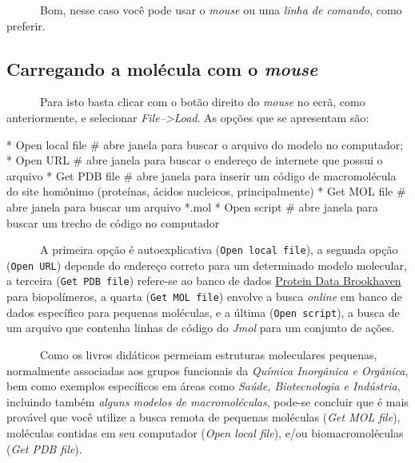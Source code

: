 \documentclass[
  letterpaper,
  DIV=11,
  numbers=noendperiod]{scrreprt}
\newenvironment{Shaded}{\begin{snugshade}}{\end{snugshade}}
\newcommand{\CommentTok}[1]{\textcolor[rgb]{0.37,0.37,0.37}{#1}}
\newcommand{\NormalTok}[1]{\textcolor[rgb]{0.00,0.23,0.31}{#1}}
\newcommand{\SpecialCharTok}[1]{\textcolor[rgb]{0.37,0.37,0.37}{#1}}
\begin{document}
~~~~~~Bom, nesse caso você pode usar o \emph{mouse} ou uma \emph{linha
de comando}, como preferir.

\subsection{\texorpdfstring{Carregando a molécula com o
\emph{mouse}}{Carregando a molécula com o mouse}}\label{carregando-a-moluxe9cula-com-o-mouse}

~~~~~~Para isto basta clicar com o botão direito do \emph{mouse} no
ecrã, como anteriormente, e selecionar \emph{File--\textgreater Load}.
As opções que se apresentam são:

\begin{Shaded}
\begin{Highlighting}[]
\SpecialCharTok{*}\NormalTok{ Open local file }\CommentTok{\# abre janela para buscar o arquivo do modelo no computador;}
\SpecialCharTok{*}\NormalTok{ Open URL }\CommentTok{\# abre janela para buscar o endereço de internete que possui o arquivo}
\SpecialCharTok{*}\NormalTok{ Get PDB file }\CommentTok{\# abre janela para inserir um código de macromolécula do site homônimo (proteínas, ácidos nucleicos, principalmente)}
\SpecialCharTok{*}\NormalTok{ Get MOL file }\CommentTok{\# abre janela para buscar um arquivo *.mol}
\SpecialCharTok{*}\NormalTok{ Open script }\CommentTok{\# abre janela para buscar um trecho de código no computador}
\end{Highlighting}
\end{Shaded}

~~~~~~A primeira opção é autoexplicativa (\texttt{Open\ local\ file}), a
segunda opção (\texttt{Open\ URL}) depende do endereço correto para um
determinado modelo molecular, a terceira (\texttt{Get\ PDB\ file})
refere-se ao banco de dados \href{https://www.rcsb.org}{Protein Data
Brookhaven} para biopolímeros, a quarta (\texttt{Get\ MOL\ file})
envolve a busca \emph{online} em banco de dados específico para pequenas
moléculas, e a última (\texttt{Open\ script}), a busca de um arquivo que
contenha linhas de código do \emph{Jmol} para um conjunto de ações.

~~~~~~Como os livros didáticos permeiam estruturas moleculares pequenas,
normalmente associadas aos grupos funcionais da \emph{Química Inorgânica
e Orgânica}, bem como exemplos específicos em áreas como \emph{Saúde,
Biotecnologia e Indústria}, incluindo também \emph{alguns modelos de
macromoléculas}, pode-se concluir que é mais provável que você utilize a
busca remota de pequenas moléculas (\emph{Get MOL file}), moléculas
contidas em seu computador (\emph{Open local file}), e/ou
biomacromoléculas (\emph{Get PDB file}).
\end{document}
